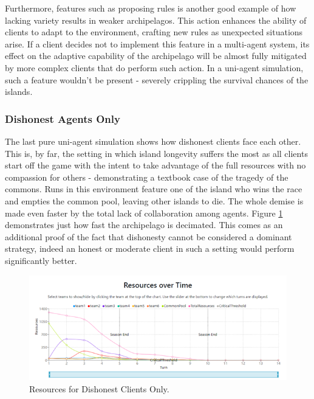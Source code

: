 Furthermore, features such as proposing rules is another good example of how lacking variety results in weaker archipelagos. This action enhances the ability of clients to adapt to the environment, crafting new rules as unexpected situations arise. If a client decides not to implement this feature in a multi-agent system, its effect on the adaptive capability of the archipelago will be almost fully mitigated by more complex clients that do perform such action. In a uni-agent simulation, such a feature wouldn't be present - severely crippling the survival chances of the islands.

\subsubsection{Dishonest Agents Only} \label{dishonestAD}
The last pure uni-agent simulation shows how dishonest clients face each other. This is, by far, the setting in which island longevity suffers the most as all clients start off the game with the intent to take advantage of the full resources with no compassion for others - demonstrating a textbook case of the tragedy of the commons. Runs in this environment feature one of the island who wins the race and empties the common pool, leaving other islands to die. The whole demise is made even faster by the total lack of collaboration among agents. Figure \ref{fig:ResourcesDD} demonstrates just how fast the archipelago is decimated. This comes as an additional proof of the fact that dishonesty cannot be considered a dominant strategy, indeed an honest or moderate client in such a setting would perform significantly better.
\begin{figure}[H]
\centering
\includegraphics[scale=0.8]{12_team4_agentdesign/images/ResourcesDD.png}
\caption{Resources for Dishonest Clients Only.}
\label{fig:ResourcesDD}
\end{figure}

